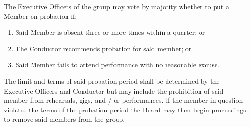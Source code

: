 \documentclass{article}
\begin{document}
The Executive Officers of the group may vote by majority whether to
put a Member on probation if:
\begin{enumerate}
\item Said Member is absent three or more times within a quarter; or
\item The Conductor recommends probation for said member; or
\item Said Member fails to attend performance with no reasonable excuse.
\end{enumerate}
The limit and terms of said probation period shall be determined by
the Executive Officers and Conductor but may include the prohibition
of said member from rehearsals, gigs, and / or performances. If the
member in question violates the terms of the probation period the
Board may then begin proceedings to remove said members from the group.

\end{document}
